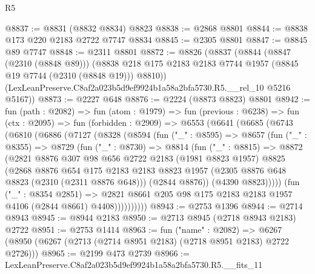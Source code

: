 \begin{lexlean}{R5}
\begin{coremodule}
@8837 := @8831 (@8832 @8834) @8823
@8838 := @2868 @8801
@8844 := @8838 @173 @220 @2183 @2722 @7747 @8834
@8845 := @2305 @8801
@8847 := @8845 @89 @7747
@8848 := @2311 @8801
@8872 := @8826
    (@8837
      (@8844
        (@8847 (@2310 (@8848 @89)))
        (@8838 @218 @175 @2183 @2183 @7744 @1957 (@8845 @19 @7744 (@2310 (@8848 @19))) @8810))
      (LexLeanPreserve.C8af2a023b5d9ef9924b1a58a2bfa5730.R5.__rel_10 @5216 @5167))
@8873 := @2227 @648
@8876 := @2224 (@8873 @8823) @8801
@8942 := fun (path : @2082) =>
  fun (atom : @1979) =>
  fun (previous : @6238) =>
  fun (ctx : @2095) =>
  fun (forbidden : @2909) =>
  @6553
    (@6641
      (@6685
        (@6743
          (@6810
            (@6886
              (@7127
                (@8328
                  (@8594
                    (fun ("_" : @8595) =>
                    @8657
                      (fun ("_" : @8355) =>
                      @8729
                        (fun ("_" : @8730) =>
                        @8814
                          (fun ("_" : @8815) =>
                          @8872
                            (@2821
                              @8876
                              @307
                              @98
                              @656
                              @2722
                              @2183
                              (@1981 @8823 @1957)
                              @8825
                              (@2868
                                @8876
                                @654
                                @175
                                @2183
                                @2183
                                @8823
                                @1957
                                (@2305 @8876 @648 @8823 (@2310 (@2311 @8876 @648)))
                                (@2844 @8876))
                              (@4390 @8823)))))
                      (fun ("_" : @8354 @2851) =>
                      @2821
                        @8661
                        @205
                        @98
                        @175
                        @2183
                        @2183
                        @1957
                        @4106
                        (@2844 @8661)
                        @4408))))))))))
@8943 := @2753 @1396
@8944 := @2714 @8943
@8945 := @8944 @2183
@8950 := @2713 @8945 (@2718 @8943 @2183) @2722
@8951 := @2753 @1414
@8963 := fun ("name" : @2082) =>
  @6267 (@8950 (@6267 (@2713 (@2714 @8951 @2183) (@2718 @8951 @2183) @2722 @2726)))
@8965 := @2199 @473 @2739
@8966 := LexLeanPreserve.C8af2a023b5d9ef9924b1a58a2bfa5730.R5.__fits_11

\end{coremodule}
\end{lexlean}
